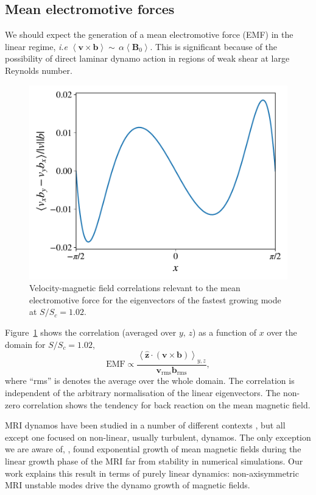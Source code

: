 \documentclass[openacc]{rsproca_new}%
\newcommand{\SSC}{S/S_{c}}
\begin{document}
\subsection{Mean electromotive forces}
\label{sec:emf}
We should expect the generation of a mean electromotive force (EMF) in the linear regime, \textit{i.e}
$\left<\boldsymbol{v}\times\boldsymbol{b}\right>\sim\,\alpha\!\left<\boldsymbol{B}_{0}\right>$.
This is significant because of the possibility of direct laminar dynamo action in regions of weak shear at large Reynolds number.
\begin{figure}[h!]
  \includegraphics[width=\columnwidth]{mean_field_alpha_run_11_output.pdf}
  \caption{Velocity-magnetic field correlations relevant to the mean electromotive force for the eigenvectors of the fastest growing mode at $\SSC = 1.02$.}
  \label{fig:correlation}
\end{figure}
Figure~\ref{fig:correlation} shows the correlation (averaged over $y,\,z$) as a function of $x$ over the domain for $\SSC = 1.02$,
\begin{equation}
\text{EMF}\propto\frac{\left<\boldsymbol{\hat{z}}\cdot(\boldsymbol{v}\times\boldsymbol{b})\right>_{\!y,z}}{\boldsymbol{v}_{\text{rms}}\boldsymbol{b}_{\text{rms}}},
\end{equation}
where ``rms'' is denotes the average over the whole domain. 
The correlation is independent of the arbitrary normalisation of the linear eigenvectors.
The non-zero correlation shows the tendency for back reaction on the mean magnetic field.

MRI dynamos have been studied in a number of different contexts \cite{2007PhRvL..98y4502R,2011ApJ...740...18O,2015PhRvL.114h5002S}, but all except one focused on non-linear, usually turbulent, dynamos. 
The only exception we are aware of, \cite{2016MNRAS.462..818B}, found exponential growth of mean magnetic fields during the linear growth phase of the MRI far from stability in numerical simulations.
Our work explains this result in terms of purely linear dynamics:
non-axisymmetric MRI unstable modes drive the dynamo growth of magnetic fields.
\end{document}
